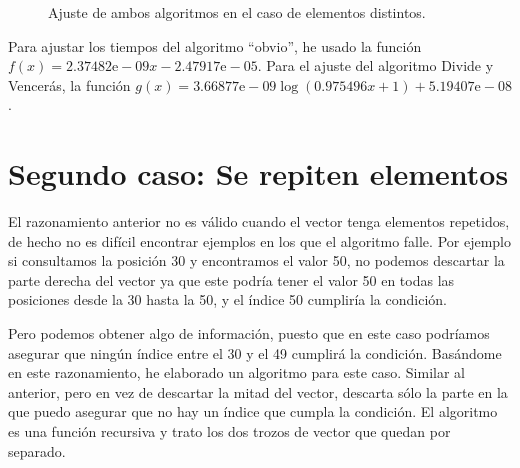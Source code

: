 \documentclass[a4]{article}
\begin{document}
\begin{figure}[H]
  \centering
  \caption{Ajuste de ambos algoritmos en el caso de elementos distintos.}
  \label{fig:ajust-distintos}
\end{figure}

Para ajustar los tiempos del algoritmo ``obvio'', he usado la función
\\ $f(x)=2.37482\mbox{e}-09x-2.47917\mbox{e}-05$. Para el ajuste del
algoritmo Divide y Vencerás, la función
$g(x)=3.66877\mbox{e}-09\log(0.975496x+1)+5.19407\mbox{e}-08$.

\section{Segundo caso: Se repiten elementos}
El razonamiento anterior no es válido cuando el vector tenga elementos
repetidos, de hecho no es difícil encontrar ejemplos en los que el
algoritmo falle. Por ejemplo si consultamos la posición 30 y
encontramos el valor 50, no podemos descartar la parte derecha del
vector ya que este podría tener el valor 50 en todas las posiciones
desde la 30 hasta la 50, y el índice 50 cumpliría la condición.

Pero podemos obtener algo de información, puesto que en este caso
podríamos asegurar que ningún índice entre el 30 y el 49 cumplirá la
condición. Basándome en este razonamiento, he elaborado un algoritmo
para este caso. Similar al anterior, pero en vez de descartar la mitad
del vector, descarta sólo la parte en la que puedo asegurar que no hay
un índice que cumpla la condición. El algoritmo es una función
recursiva y trato los dos trozos de vector que quedan por separado.
\end{document}
